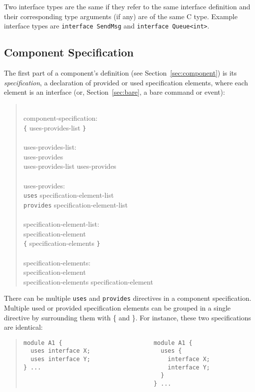 \documentclass[11pt,letterpaper]{article}
\newcommand{\kw}[1]{{\tt #1}}
\newcommand{\grammarshift}{\vspace*{-.7cm}}
\newcommand{\grammarindent}{\hspace*{2cm}\= \\ \kill}
\begin{document}
Two interface types are the same if they refer to the same interface
definition and their corresponding type arguments (if any) are of the same
C type. Example interface types are \kw{interface SendMsg} and
\kw{interface Queue<int>}.

\subsection{Component Specification}
\label{sec:component-spec}

The first part of a component's definition (see Section~\ref{sec:component})
is its \emph{specification}, a declaration of provided or used
specification elements, where each element is an interface (or,
Section~\ref{sec:bare}, a bare command or event):
\begin{quote} \grammarshift \em \begin{tabbing}
\grammarindent
component-specification:\\
\>	\kw{\{} uses-provides-list \kw{\}}\\
\\
uses-provides-list:\\
\>	uses-provides\\
\>	uses-provides-list uses-provides\\
\\
uses-provides:\\
\>	\kw{uses} specification-element-list\\
\>	\kw{provides} specification-element-list\\
\\
specification-element-list:\\
\>	specification-element\\
\>	\kw{\{} specification-elements \kw{\}}\\
\\
specification-elements:\\
\>	specification-element\\
\>	specification-elements specification-element\\
\end{tabbing} \end{quote}
There can be multiple \kw{uses} and \kw{provides} directives in a component
specification. Multiple used or provided specification elements can be
grouped in a single directive by surrounding them with \{ and \}. For
instance, these two specifications are identical:

\begin{quote} \begin{verbatim}
module A1 {                          module A1 {      
  uses interface X;                    uses {         
  uses interface Y;                      interface X; 
} ...                                    interface Y; 
                                       }              
                                     } ...            
\end{verbatim} \end{quote}
\end{document}
